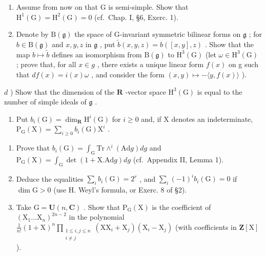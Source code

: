 \begin{enumerate}
\begin{enumerate}
\def\labelenumi{\alph{enumi})}
\setcounter{enumi}{1}
\item
  Assume from now on that G is semi-simple. Show that \(\mathrm{H}^{1}(\mathrm{G})=\mathrm{H}^{2}(\mathrm{G})=0\) (cf.~Chap. I, §6, Exerc. 1).
\item
  Denote by \(\mathrm{B}(\mathfrak{g})\) the space of G-invariant symmetric bilinear forms on \(\mathfrak{g}\) ; for \(b \in \mathrm{B}(\mathfrak{g})\) and \(x, y, z\) in \(\mathfrak{g}\) , put \(\tilde{b}(x, y, z) = b([x, y], z)\) . Show that the map \(b \mapsto \tilde{b}\) defines an isomorphism from \(\mathrm{B}(\mathfrak{g})\) to \(\mathrm{H}^{3}(\mathrm{G})\) (let \(\omega\in\mathrm{H}^{3}(\mathrm{G})\) ; prove that, for all \(x\in g\) , there exists a unique linear form \(f(x)\) on g such that \(df(x)=i(x)\omega\) , and consider the form \((x,y)\mapsto-\langle y,f(x)\rangle\) ).
\end{enumerate}

\(d\) ) Show that the dimension of the \(\mathbf{R}\) -vector space \(\mathrm{H}^3 (\mathrm{G})\) is equal to the number of simple ideals of \(\mathfrak{g}\) .

\begin{enumerate}
\def\labelenumi{\arabic{enumi})}
\setcounter{enumi}{5}
\tightlist
\item
  Put \(b_{i}(\mathrm{G}) = \dim_{\mathbf{R}} \mathrm{H}^{i}(\mathrm{G})\) for \(i \geq 0\) and, if \(\mathrm{X}\) denotes an indeterminate, \(\mathrm{P}_{\mathrm{G}}(\mathrm{X}) = \sum_{i \geq 0} b_{i}(\mathrm{G}) \mathrm{X}^{i}\) .
\end{enumerate}

\begin{enumerate}
\def\labelenumi{\alph{enumi})}
\item
  Prove that \(b_{i}(\mathrm{G}) = \int_{\mathrm{G}} \mathrm{Tr} \wedge^{i} (\mathrm{Ad} g) dg\) and \(\mathrm{P}_{\mathrm{G}}(\mathrm{X}) = \int_{\mathrm{G}} \det(1 + \mathrm{X}. \mathrm{Ad} g) dg\) (cf.~Appendix II, Lemma 1).
\item
  Deduce the equalities \(\sum_{i} b_{i}(\mathrm{G}) = 2^{r}\) , and \(\sum_{i} (-1)^{i} b_{i}(\mathrm{G}) = 0\) if \(\dim \mathrm{G} > 0\) (use H. Weyl's formula, or Exerc. 8 of §2).
\item
  Take \(\mathrm{G} = \mathbf{U}(n, \mathbf{C})\) . Show that \(\mathrm{P}_{\mathrm{G}}(\mathrm{X})\) is the coefficient of \((\mathrm{X}_1 \ldots \mathrm{X}_n)^{2n-2}\) in the polynomial \(\frac{1}{n!}(1 + \mathrm{X})^n \prod_{\substack{1 \leq i, j \leq n \\ i \neq j}} (\mathrm{XX}_i + \mathrm{X}_j)(\mathrm{X}_i - \mathrm{X}_j)\) (with coefficients in \(\mathbf{Z}[\mathrm{X}]\) ).
\end{enumerate}


\end{enumerate}
